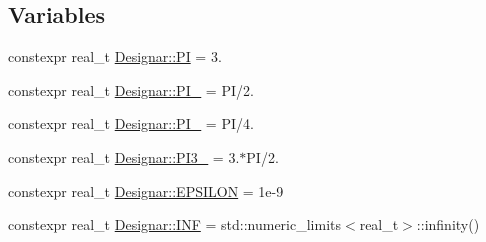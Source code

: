 \subsection*{Variables}
\begin{DoxyCompactItemize}
\item 
constexpr real\+\_\+t \hyperlink{namespace_designar_a2085e876f193b2212cd11dd2770b2d0b}{Designar\+::\+PI} = 3.
\item 
constexpr real\+\_\+t \hyperlink{namespace_designar_a06ae46c26bfae21d3284882e3f5b9f60}{Designar\+::\+P\+I\+\_} = PI/2.
\item 
constexpr real\+\_\+t \hyperlink{namespace_designar_a5d073eb77d1d0886610584ee1441d8de}{Designar\+::\+P\+I\+\_} = PI/4.
\item 
constexpr real\+\_\+t \hyperlink{namespace_designar_acdac587da03b3c280ba8c4b2ef3f6983}{Designar\+::\+P\+I3\+\_} = 3.$\ast$PI/2.
\item 
constexpr real\+\_\+t \hyperlink{namespace_designar_a00f1421c35b33865c9c955435b35e514}{Designar\+::\+E\+P\+S\+I\+L\+ON} = 1e-\/9
\item 
constexpr real\+\_\+t \hyperlink{namespace_designar_a74903000a6e8d8117bb29540ef1d07ae}{Designar\+::\+I\+NF} = std\+::numeric\+\_\+limits$<$real\+\_\+t$>$\+::infinity()
\end{DoxyCompactItemize}
